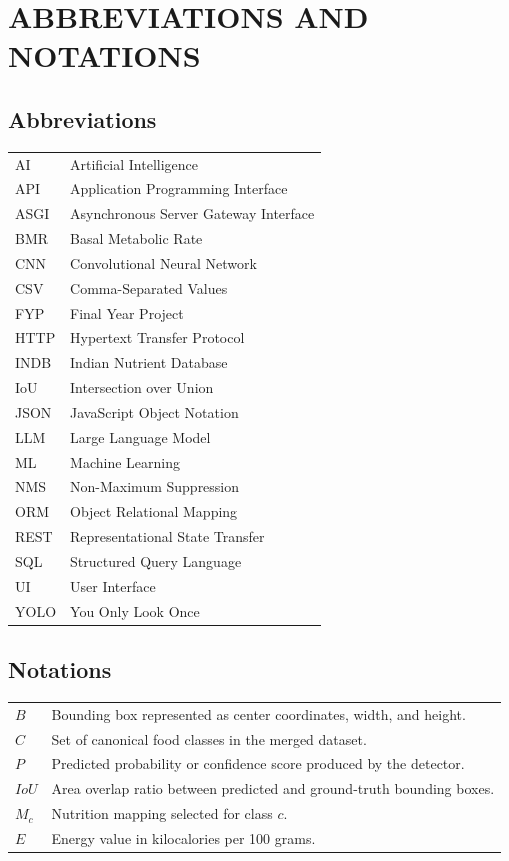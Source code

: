 \chapter*{ABBREVIATIONS AND NOTATIONS}

\section*{Abbreviations}
\begin{longtable}{p{}p{}}
AI & Artificial Intelligence\\
API & Application Programming Interface\\
ASGI & Asynchronous Server Gateway Interface\\
BMR & Basal Metabolic Rate\\
CNN & Convolutional Neural Network\\
CSV & Comma-Separated Values\\
FYP & Final Year Project\\
HTTP & Hypertext Transfer Protocol\\
INDB & Indian Nutrient Database\\
IoU & Intersection over Union\\
JSON & JavaScript Object Notation\\
LLM & Large Language Model\\
ML & Machine Learning\\
NMS & Non-Maximum Suppression\\
ORM & Object Relational Mapping\\
REST & Representational State Transfer\\
SQL & Structured Query Language\\
UI & User Interface\\
YOLO & You Only Look Once\\
\end{longtable}

\section*{Notations}
\begin{longtable}{p{}p{}}
$B$ & Bounding box represented as center coordinates, width, and height.\\
$C$ & Set of canonical food classes in the merged dataset.\\
$P$ & Predicted probability or confidence score produced by the detector.\\
$IoU$ & Area overlap ratio between predicted and ground-truth bounding boxes.\\
$M_c$ & Nutrition mapping selected for class $c$.\\
$E$ & Energy value in kilocalories per 100 grams.\\
\end{longtable}
